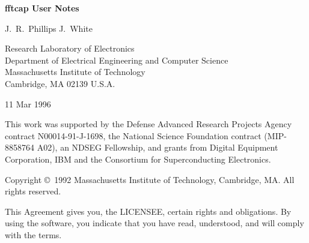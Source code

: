 
\pagestyle{headings}


\setlength{\oddsidemargin}{0.25in}      %
\setlength{\evensidemargin}{0.00in}     %
\setlength{\topmargin}{0.0in}           %
\setlength{\textwidth}{6.25in}          %
\setlength{\textheight}{9in}            %
\addtolength{\topmargin}{-\headheight}  %
\addtolength{\topmargin}{-\headsep}     %

\newcommand{\thecode}{{\tt fftcap }}
\newcommand{\fastcap}{{\tt fastcap }}




\begin{titlepage}
\vskip 36pt
\begin{center}
{\bf fftcap User Notes}
\end{center}

\vskip 18pt
\begin{center}
\hspace*{1.0in} J.~R.~Phillips \hfill J.\ White\hspace*{1.0in}
\end{center}

\vskip 18pt
\begin{center}
Research Laboratory of Electronics \\
Department of Electrical Engineering and Computer Science \\
Massachusetts Institute of Technology \\
Cambridge, MA  02139 U.S.A.
\end{center}
\vskip 18pt
\begin{center}
11 Mar 1996
\end{center}

\vfill
\noindent This work was supported by the Defense Advanced Research Projects
Agency contract N00014-91-J-1698,
the National Science Foundation contract (MIP-8858764 A02), an NDSEG Fellowship,
and grants from Digital Equipment Corporation, IBM and the Consortium for
Superconducting Electronics. 

\mbox{}
\vfill
\noindent Copyright \copyright\ 1992 Massachusetts Institute of Technology,
Cambridge, MA.  All rights reserved.

\vspace{\baselineskip}
\noindent This Agreement gives you, the LICENSEE, certain rights 
and obligations.
By using the software, you indicate that you have read, understood, and
will comply with the terms.


\end{titlepage}
